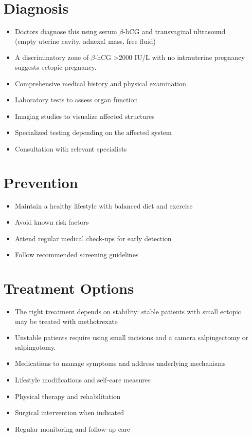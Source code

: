\section{Diagnosis}
\begin{itemize}[noitemsep]
  \item Doctors diagnose this using serum $\beta$-hCG and transvaginal ultrasound (empty uterine cavity, adnexal mass, free fluid)
  \item A discriminatory zone of $\beta$-hCG >2000 IU/L with no intrauterine pregnancy suggests ectopic pregnancy.
  \item Comprehensive medical history and physical examination
  \item Laboratory tests to assess organ function
  \item Imaging studies to visualize affected structures
  \item Specialized testing depending on the affected system
  \item Consultation with relevant specialists
\end{itemize}
\section{Prevention}
\begin{itemize}[noitemsep]
  \item Maintain a healthy lifestyle with balanced diet and exercise
  \item Avoid known risk factors
  \item Attend regular medical check-ups for early detection
  \item Follow recommended screening guidelines
\end{itemize}
\section{Treatment Options}
\begin{itemize}[noitemsep]
  \item The right treatment depends on stability: stable patients with small ectopic may be treated with methotrexate
  \item Unstable patients require using small incisions and a camera salpingectomy or salpingotomy.
  \item Medications to manage symptoms and address underlying mechanisms
  \item Lifestyle modifications and self-care measures
  \item Physical therapy and rehabilitation
  \item Surgical intervention when indicated
  \item Regular monitoring and follow-up care
\end{itemize}
